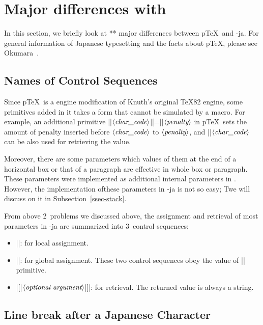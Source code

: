 \documentclass{ajt}
\begin{document}
\section{Major differences with \pTeX}
In this section, we briefly look at ** major differences between p\TeX\
and \LuaTeX-ja.  For general information of Japanese typesetting and the
facts about p\TeX, please see Okumara~\cite{ptexjp}.


\subsection{Names of Control Sequences}
\label{ssec-csname}
Since p\TeX\ is a engine modification of Knuth's original \TeX82 engine,
some primitives added in it takes a form that cannot be simulated by a
macro.  For example, an additional primitive
|\prebreakpenalty|$\langle\hbox{\it
char\_code}\rangle$|[=]|$\langle\hbox{\it penalty}\rangle$ in p\TeX\
sets the amount of penalty inserted before $\langle\hbox{\it
char\_code}\rangle$ to $\langle\hbox{\it penalty}\rangle$, and
|\prebreakpenalty|$\langle\hbox{\it char\_code}\rangle$ can be also used
for retrieving the value.

Moreover, there are some parameters which values of them at the end of a
horizontal box or that of a paragraph are effective in whole box or
paragraph.  These parameters were implemented as additional internal
parameters in \pTeX. However, the implementation ofthese parameters in
\LuaTeX-ja is not so easy; Twe will discuss on it in
Subsection~\ref{ssec-stack}.

From above 2~problems we discussed above, the assignment and retrieval
of most parameters in \LuaTeX-ja are summarized into 3~control sequences:
\begin{itemize}
\item ||: for local
      assignment.
\item |\ltjglobalsetparameter|: for global assignment. These two control
      sequences obey the value of |\globaldefs| primitive.
\item |\ltjgetparameter{|$\langle\hbox{\it
      name}\rangle$|}[{|$\langle\hbox{\it optional
      argument}\rangle$|}]|: for retrieval. The returned value is always
      a string.
\end{itemize}

\subsection{Line break after a Japanese Character}
\label{ssec-line} 
\end{document}
